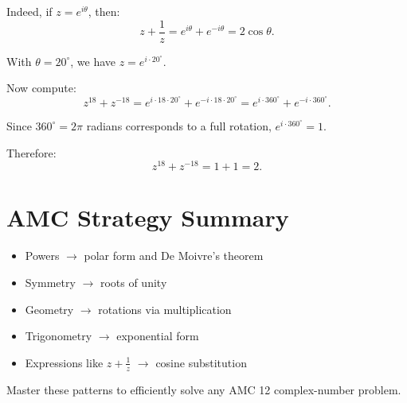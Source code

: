 \documentclass[12pt]{extarticle}
\begin{document}
Indeed, if $z = e^{i\theta}$, then:
\[
z + \frac{1}{z} = e^{i\theta} + e^{-i\theta} = 2\cos\theta.
\]

With $\theta = 20^\circ$, we have $z = e^{i \cdot 20^\circ}$.

Now compute:
\[
z^{18} + z^{-18} = e^{i \cdot 18 \cdot 20^\circ} + e^{-i \cdot 18 \cdot 20^\circ} = e^{i \cdot 360^\circ} + e^{-i \cdot 360^\circ}.
\]

Since $360^\circ = 2\pi$ radians corresponds to a full rotation, $e^{i \cdot 360^\circ} = 1$.

Therefore:
\[
z^{18} + z^{-18} = 1 + 1 = 2.
\]


\section*{AMC Strategy Summary}
\begin{itemize}
    \item Powers $\rightarrow$ polar form and De Moivre's theorem
    \item Symmetry $\rightarrow$ roots of unity
    \item Geometry $\rightarrow$ rotations via multiplication
    \item Trigonometry $\rightarrow$ exponential form
    \item Expressions like $z + \tfrac{1}{z}$ $\rightarrow$ cosine substitution
\end{itemize}

Master these patterns to efficiently solve any AMC 12 complex-number problem.
\end{document}
